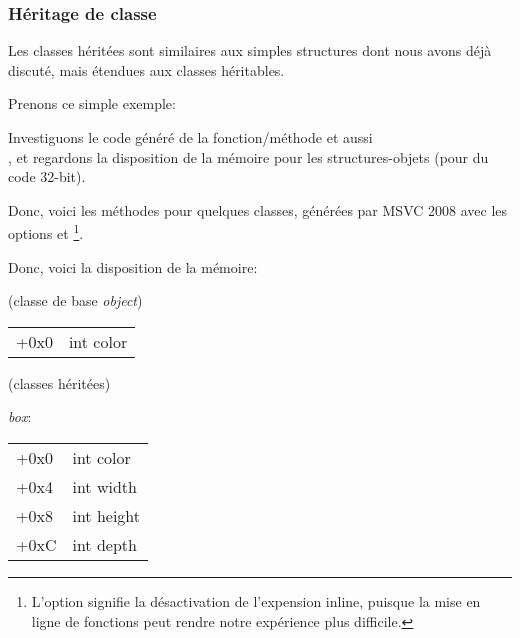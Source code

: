 \subsubsection{Héritage de classe}
\label{cpp_inheritance}

Les classes héritées sont similaires aux simples structures dont nous avons déjà
discuté, mais étendues aux classes héritables.

Prenons ce simple exemple:



Investiguons le code généré de la fonction/méthode  et aussi \\
,
et regardons la disposition de la mémoire pour les structures-objets (pour du code
32-bit).


Donc, voici les méthodes  pour quelques classes, générées par
MSVC 2008 avec les options \Ox et \Obzero
\footnote{L'option \Obzero signifie la désactivation de l'expension inline, puisque
la mise en ligne de fonctions peut rendre notre expérience plus difficile.}.







Donc, voici la disposition de la mémoire:

(classe de base \emph{object})

\begin{center}
\begin{tabular}{ | l | l | }
\hline
  \tableheader{} \\
\hline
  +0x0 & int color \\
\hline
\end{tabular}
\end{center}

(classes héritées)

\emph{box}:

\begin{center}
\begin{tabular}{ | l | l | }
\hline
  \tableheader{} \\
\hline
  +0x0 & int color \\
\hline
  +0x4 & int width \\
\hline
  +0x8 & int height \\
\hline
  +0xC & int depth \\
\hline
\end{tabular}
\end{center}

